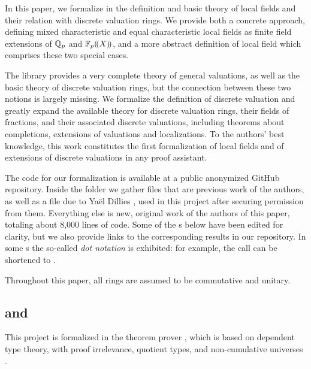 \documentclass[sigplan,10pt, nonacm, review]{acmart}
\begin{document}
In this paper, we formalize in \lean the definition and basic theory of local fields and their relation with discrete valuation rings. We provide both a concrete approach, defining mixed characteristic and equal characteristic local fields as finite field extensions of $\mathbb{Q}_p$ and ${\mathbb{F}_{p}}(\!(X)\!)$, and a more abstract definition of local field which comprises these two special cases. 

The \mathlib library provides 
a very complete theory of general valuations, as well as the basic theory of discrete valuation rings, but the connection between these two notions is largely missing. We formalize the definition of discrete valuation and greatly expand the available theory for discrete valuation rings, their fields of fractions, and their associated discrete valuations, including theorems about completions, extensions of valuations and localizations.
To the authors' best knowledge, this work constitutes the first formalization of local fields and of extensions of discrete valuations in any proof assistant.

The \lean[\empty] code for our formalization is available at a public anonymized GitHub repository\href{https://github.com/LCFT-Lean/local_fields}{\extlink}. Inside the folder \href{https://github.com/LCFT-Lean/local_fields/tree/master/src/from_mathlib}{\extlink} we gather files that are previous work of the authors, as well as a file due to Yaël Dillies \href{https://github.com/LCFT-Lean/local_fields/blob/master/src/from_mathlib/PR18604_well_founded.lean}{\extlink}, used in this project after securing permission from them. Everything else is new, original work of the authors of this paper, totaling about 8,000 lines of code. Some of the \LClistingname s below have been edited for clarity, but we also provide links to the corresponding results in our repository. In some \LClistingname s the so-called \emph{dot notation} is exhibited: for example, the call  can be shortened to .

Throughout this paper, all rings are assumed to be commutative and unitary.

\subsection{\texorpdfstring{\lean[\empty] and \mathlib}{Lean and mathlib}}
This project is formalized in the \lean theorem prover \cite{Lean3}, which is based on dependent type theory, with proof irrelevance, quotient types, and non-cumulative universes \cite{TypeTheory}.
\end{document}
